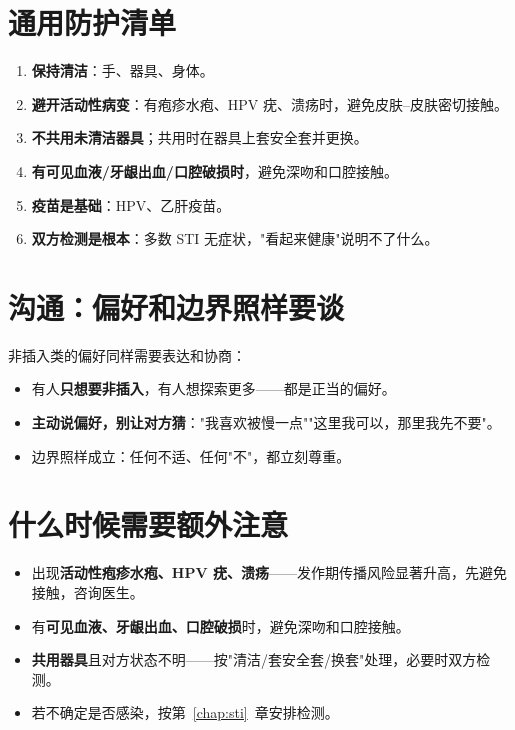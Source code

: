 \section{通用防护清单}

\begin{enumerate}[leftmargin=2em,itemsep=0.3em]
  \item \textbf{保持清洁}：手、器具、身体。
  \item \textbf{避开活动性病变}：有疱疹水疱、HPV 疣、溃疡时，避免皮肤--皮肤密切接触。
  \item \textbf{不共用未清洁器具}；共用时在器具上套安全套并更换。
  \item \textbf{有可见血液/牙龈出血/口腔破损时}，避免深吻和口腔接触。
  \item \textbf{疫苗是基础}：HPV、乙肝疫苗。
  \item \textbf{双方检测是根本}：多数 STI 无症状，"看起来健康"说明不了什么。
\end{enumerate}

\section{沟通：偏好和边界照样要谈}

非插入类的偏好同样需要表达和协商：

\begin{itemize}[leftmargin=2em]
  \item 有人\textbf{只想要非插入}，有人想探索更多——都是正当的偏好。
  \item \textbf{主动说偏好，别让对方猜}："我喜欢被慢一点""这里我可以，那里我先不要"。
  \item 边界照样成立：任何不适、任何"不"，都立刻尊重。
\end{itemize}

\section{什么时候需要额外注意}

\begin{itemize}[leftmargin=2em]
  \item 出现\textbf{活动性疱疹水疱、HPV 疣、溃疡}——发作期传播风险显著升高，先避免接触，咨询医生。
  \item 有\textbf{可见血液、牙龈出血、口腔破损}时，避免深吻和口腔接触。
  \item \textbf{共用器具}且对方状态不明——按"清洁/套安全套/换套"处理，必要时双方检测。
  \item 若不确定是否感染，按第~\ref{chap:sti}~章安排检测。
\end{itemize}

